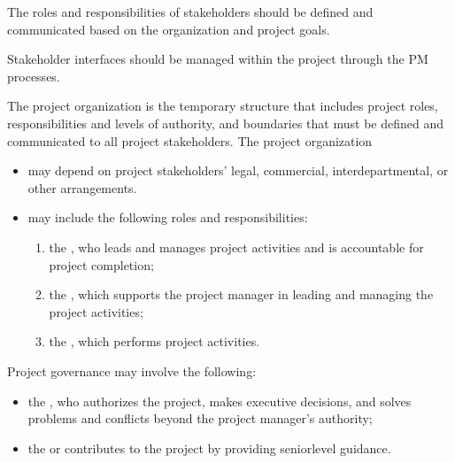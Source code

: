 \documentclass[letterpaper,10pt,english]{jupyterBook}
\begin{document}
\sphinxAtStartPar
The roles and responsibilities of stakeholders should be defined and communicated based on the organization and project goals.

\sphinxAtStartPar
Stakeholder interfaces should be managed within the project through the PM processes.

\sphinxAtStartPar
The project organization is the temporary structure that includes project roles, responsibilities and levels of authority, and boundaries that must be defined and communicated to all project stakeholders.
The project organization
\begin{itemize}
\item {} 
\sphinxAtStartPar
may depend on project stakeholders’ legal, commercial, interdepartmental, or other arrangements.

\item {} 
\sphinxAtStartPar
may include the following roles and responsibilities:
\begin{enumerate}
%
\item {} 
\sphinxAtStartPar
the , who leads and manages project activities and is accountable for project completion;

\item {} 
\sphinxAtStartPar
the , which supports the project manager in leading and managing the project activities;

\item {} 
\sphinxAtStartPar
the , which performs project activities.

\end{enumerate}

\end{itemize}

\sphinxAtStartPar
Project governance may involve the following:
\begin{itemize}
\item {} 
\sphinxAtStartPar
the , who authorizes the project, makes executive decisions, and solves problems and conflicts beyond the project manager’s authority;

\item {} 
\sphinxAtStartPar
the  or  contributes to the project by providing senior\sphinxhyphen{}level guidance.

\end{itemize}
\end{document}
